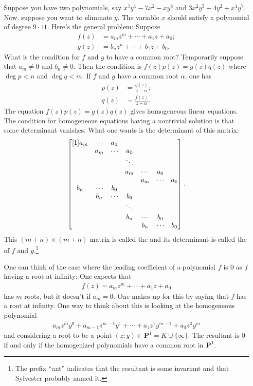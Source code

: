\documentclass [11 pt, oneside] {article}
\begin{document}
		Suppose you have two polynomials, say $x^3y^4 - 7x^2-xy^8$ and $3x^2y^5+4y^2+x^4y^7$. Now, suppose you want to eliminate $y$. The variable $x$ should satisfy a polynomial of degree $9\cdot 11$. Here's the general problem: Suppose
		\begin{align*}
			f(z)&=a_mz^m+\cdots +  a_1z+a_0;\\
			g(z)&=b_nz^n+\cdots +  b_1z+b_0.
		\end{align*}
What is the condition for $f$ and $g$ to have a common root? Temporarily suppose that $a_m\ne 0$ and $b_n\ne 0$. Then the condition is $f(z)p (z)=g (z)q (z)$ where $\deg p<n$ and $\deg q<m$. If $f$ and $g$ have a common root $\alpha$, one has
\begin{align*}
	p(z)&= \frac{g(z)}{z-\alpha};\\
	q(z)&= \frac{f(z)}{z-\alpha}.
\end{align*}
The equation $f(z)p (z)=g (z)q (z)$ gives homogeneous linear equations. The condition for homogeneous equations having a nontrivial solution is that some determinant vanishes. What one wants is the determinant of this matrix:
\begin{align*}
	\begin{bmatrix} [1] a_m & \cdots & a_0 && &&\\ & a_m & \cdots & a_0& &&\\ &&&\ddots&&&\\&&&a_m & \cdots & a_0\\&&&&a_m & \cdots & a_0\\b_n & \cdots & b_0 && &&\\ & b_n & \cdots & b_0& &&\\ &&&\ddots&&&\\&&&b_n & \cdots & b_0\\&&&&b_n & \cdots & b_0 \end{bmatrix}.
\end{align*}
This $ (m+n)\times  (m+n)$ matrix is called the  and its determinant is called the  of $f$ and $g$.\footnote{The prefix ``ant'' indicates that the resultant is some invariant and that Sylvester probably named it.}

\begin{remark}\label{ifffffffffff}
	One can think of the case where the leading coefficient of a polynomial $f$ is $0$ as $f$ having a root at infinity: One expects that
	\begin{align*}
		f(z) = a_mz^m+\cdots+a_1z+a_0
	\end{align*}
	has $m$ roots, but it doesn't if $a_m=0$. One makes up for this by saying that $f$ has a root at infinity. One way to think about this is looking at the homogeneous polynomial
	\begin{align*}
		a_mz^my^0 + a_{m-1}z^{m-1}y^1+\cdots +a_1z^1y^{m-1} +a_0z^0y^m
	\end{align*}
	and considering a root to be a point $(z:y)\in  \mathbf{P}^1 = K\cup \{\infty\}$. The resultant is $0$ if and only if the homogenized polynomials have a common root in $\mathbf{P}^1$.
\end{remark}
\end{document}
